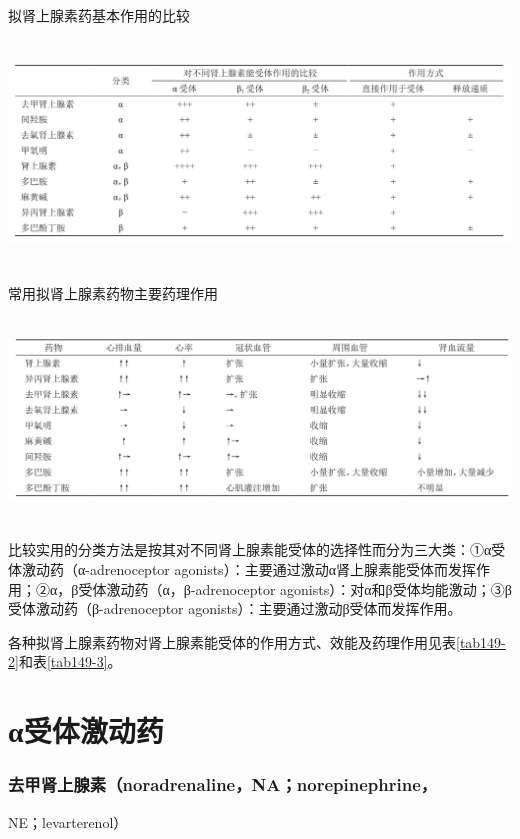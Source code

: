 \begin{table}[htbp]
\centering
\caption{拟肾上腺素药基本作用的比较}
\label{tab149-2}
\includegraphics[width=6.65625in,height=2.35417in]{./images/Image00552.jpg}
\end{table}

\begin{table}[htbp]
\centering
\caption{常用拟肾上腺素药物主要药理作用}
\label{tab149-3}
\includegraphics[width=6.60417in,height=2.125in]{./images/Image00553.jpg}
\end{table}

比较实用的分类方法是按其对不同肾上腺素能受体的选择性而分为三大类：①α受体激动药（α-adrenoceptor
agonists）：主要通过激动α肾上腺素能受体而发挥作用；②α，β受体激动药（α，β-adrenoceptor
agonists）：对α和β受体均能激动；③β受体激动药（β-adrenoceptor
agonists）：主要通过激动β受体而发挥作用。

各种拟肾上腺素药物对肾上腺素能受体的作用方式、效能及药理作用见表\ref{tab149-2}和表\ref{tab149-3}。

\section{α受体激动药}

\subsubsection{去甲肾上腺素（noradrenaline，NA；norepinephrine，}
NE；levarterenol）

